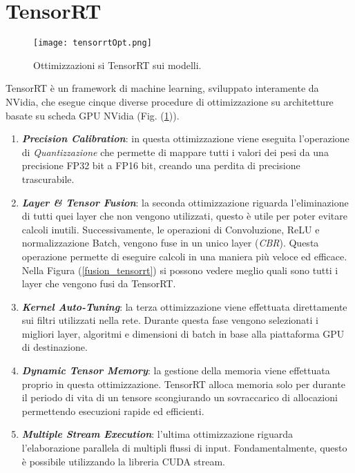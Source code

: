 \section{TensorRT}
\begin{figure}
    \centering
    \texttt{[image: tensorrtOpt.png]}
    \centering
    \caption{Ottimizzazioni si TensorRT sui modelli.}
    \label{tensorrt}
\end{figure}
TensorRT è un framework di machine learning, sviluppato interamente da 
NVidia, che esegue cinque diverse procedure di ottimizzazione su architetture 
basate su scheda GPU NVidia (Fig. (\ref{tensorrt})). 
\begin{enumerate}
    \item {\bfseries{\emph{Precision Calibration}}}: in questa ottimizzazione viene eseguita 
    l'operazione di \emph{Quantizzazione} che permette di mappare tutti i valori 
    dei pesi da una precisione FP32 bit a FP16 bit, creando una perdita 
    di precisione trascurabile.
    \item {\bfseries{\emph{Layer \& Tensor Fusion}}}: la seconda ottimizzazione riguarda l'eliminazione 
    di tutti quei layer che non vengono utilizzati, questo è 
    utile per poter evitare calcoli inutili. Successivamente, le operazioni 
    di Convoluzione, ReLU e normalizzazione Batch, vengono fuse in un 
    unico layer (\emph{CBR}). Questa operazione permette di eseguire calcoli 
    in una maniera più veloce ed efficace. Nella Figura (\ref{fusion_tensorrt}) si possono 
    vedere meglio quali sono tutti i layer che vengono fusi da TensorRT.
    \item {\bfseries{\emph{Kernel Auto-Tuning}}}: la terza ottimizzazione viene effettuata direttamente 
    sui filtri utilizzati nella rete. Durante questa fase vengono 
    selezionati i migliori layer, algoritmi e dimensioni di batch in base alla 
    piattaforma GPU di destinazione.
    \item {\bfseries{\emph{Dynamic Tensor Memory}}}: la gestione della memoria viene effettuata 
    proprio in questa ottimizzazione. TensorRT alloca memoria 
    solo per durante il periodo di vita di un tensore scongiurando un 
    sovraccarico di allocazioni permettendo esecuzioni rapide ed efficienti.
    \item {\bfseries{\emph{Multiple Stream Execution}}}: l'ultima ottimizzazione riguarda l'elaborazione 
    parallela di multipli flussi di input. Fondamentalmente, 
    questo è possibile utilizzando la libreria CUDA stream.
\end{enumerate}
